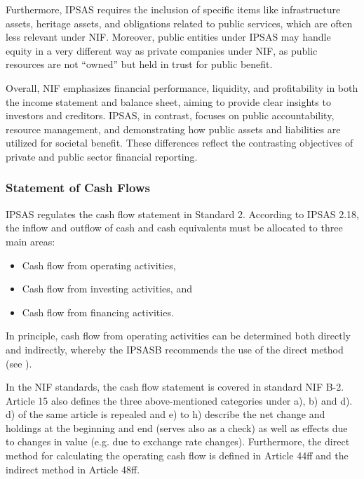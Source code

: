 \documentclass[10pt]{article}
\begin{document}
Furthermore, IPSAS requires the inclusion of specific items like infrastructure assets, heritage assets, and obligations related to public services, which are often less relevant under NIF. Moreover, public entities under IPSAS may handle equity in a very different way as private companies under NIF, as public resources are not “{}owned”{} but held in trust for public benefit.

Overall, NIF emphasizes financial performance, liquidity, and profitability in both the income statement and balance sheet, aiming to provide clear insights to investors and creditors. IPSAS, in contrast, focuses on public accountability, resource management, and demonstrating how public assets and liabilities are utilized for societal benefit. These differences reflect the contrasting objectives of private and public sector financial reporting.

\subsubsection{Statement of Cash Flows}\label{subsubsec:statement_of_cash_flows}
IPSAS regulates the cash flow statement in Standard 2. According to IPSAS 2.18, the inflow and outflow of cash and cash equivalents must be allocated to three main areas:

\begin{itemize}
    \item Cash flow from operating activities,

    \item Cash flow from investing activities, and

    \item Cash flow from financing activities.

\end{itemize}

In principle, cash flow from operating activities can be determined both directly and indirectly, whereby the IPSASB recommends the use of the direct method (see \cite[p.~63]{IPSASPraxisHB}).

In the NIF standards, the cash flow statement is covered in standard NIF B-2. Article 15 also defines the three above-mentioned categories under a), b) and d). d) of the same article is repealed and e) to h) describe the net change and holdings at the beginning and end (serves also as a check) as well as effects due to changes in value (e.g. due to exchange rate changes). Furthermore, the direct method for calculating the operating cash flow is defined in Article 44ff and the indirect method in Article 48ff.
\end{document}
